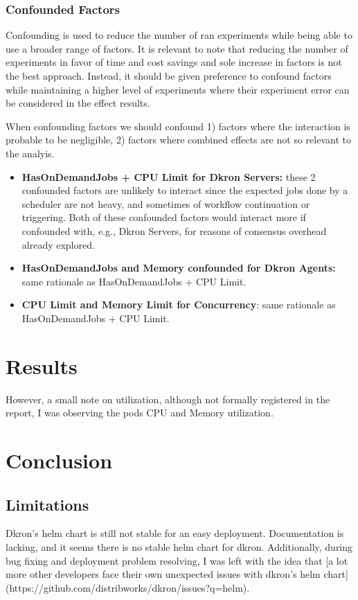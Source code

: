 \documentclass[runningheads]{llncs}
\begin{document}
\subsubsection{Confounded Factors}
Confounding is used to reduce the number of ran experiments while being able to use a broader range
of factors. It is relevant to note that reducing the number of experiments in favor of time and cost savings
and sole increase in factors is not the best approach. Instead, it should be given preference to confound
factors while maintaining a higher level of experiments where their experiment error can be considered
in the effect results.

When confounding factors we should confound 1) factors where the interaction is probable to be negligible,
2) factors where combined effects are not so relevant to the analyis.

\begin{itemize}
    \item \textbf{HasOnDemandJobs + CPU Limit for Dkron Servers:} these 2 confounded factors are unlikely to interact since the expected jobs done by
        a scheduler are not heavy, and sometimes of workflow continuation or triggering.
        Both of these confounded factors would interact more if confounded with, e.g., Dkron Servers,
        for reasons of consensus overhead already explored.
    \item \textbf{HasOnDemandJobs and Memory confounded for Dkron Agents:} same rationale as
    HasOnDemandJobs + CPU Limit.
    \item \textbf{CPU Limit and Memory Limit for Concurrency}: same rationale as HasOnDemandJobs
    + CPU Limit.
\end{itemize}



\section{Results}
\label{results}


However,
a small note on utilization, although not formally registered in the report, I was observing the
pods CPU and Memory utilization.

\section{Conclusion}
\label{conclusion}

\subsection{Limitations}
Dkron's helm chart is still not stable for an easy deployment. Documentation is lacking, and
it seems there is no stable helm chart for dkron. Additionally, during bug fixing and deployment
problem resolving, I was left with the idea that [a lot more other developers face their own
unexpected issues with dkron's helm chart](https://github.com/distribworks/dkron/issues?q=helm).
\end{document}
